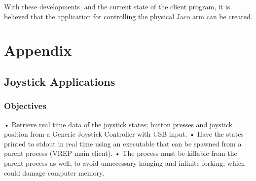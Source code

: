 \documentclass[12pt,openany,a4paper]{book}
\begin{document}
With these developments, and the current state of the client program, it is believed that the application for controlling the physical Jaco arm can be created.

\appendix


\newpage
{}
\mbox{}
\newpage



\chapter{Appendix}
\section{Joystick Applications}
\subsection{Objectives}
•	Retrieve real time data of the joystick states; button presses and joystick position from a Generic Joystick Controller with USB input.
•	Have the states printed to stdout in real time using an executable that can be spawned from a parent process (VREP main client).
•	The process must be killable from the parent process as well, to avoid unnecessary hanging and infinite forking, which could damage computer memory.
\end{document}
